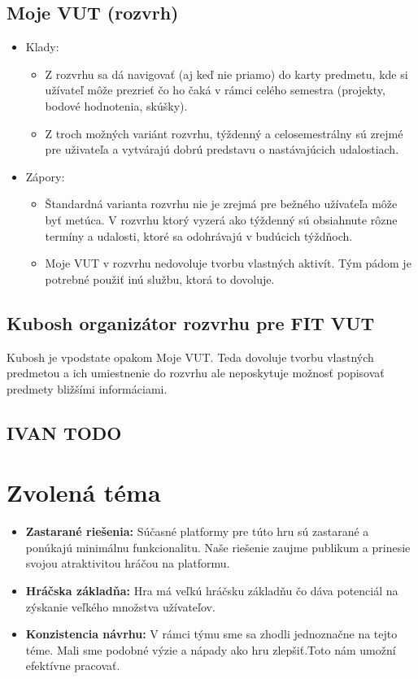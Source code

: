 \documentclass[a4paper, 11pt, onecolumn]{article}
\begin{document}
\subsection*{Moje VUT (rozvrh)}
\begin{itemize}
    \item Klady:
    \begin{itemize}
        \item Z rozvrhu sa dá navigovať (aj keď nie priamo) do karty predmetu, kde si užívateľ môže prezrieť čo ho čaká v rámci celého semestra (projekty, bodové hodnotenia, skúšky). 
        \item Z troch možných variánt rozvrhu, týždenný a celosemestrálny sú zrejmé pre uživateľa a vytvárajú dobrú predstavu o nastávajúcich udalostiach. 
    \end{itemize}
    \item Zápory:
    \begin{itemize}
        \item Štandardná varianta rozvrhu nie je zrejmá pre bežného užívaťeľa môže byť metúca. V rozvrhu ktorý vyzerá ako týždenný sú obsiahnute rôzne termíny a udalosti, ktoré sa odohrávajú v budúcich týždňoch.
        \item Moje VUT v rozvrhu nedovoluje tvorbu vlastných aktivít. Tým pádom je potrebné použiť inú službu, ktorá to dovoluje.
    \end{itemize}
\end{itemize}
\subsection*{Kubosh organizátor rozvrhu pre FIT VUT}
Kubosh je vpodstate opakom Moje VUT. Teda dovoluje tvorbu vlastných predmetou a ich umiestnenie do rozvrhu
ale neposkytuje možnosť popisovať predmety bližšími informáciami.
\subsection{IVAN TODO}
\section{Zvolená téma}
\begin{itemize}
\item \textbf{Zastarané riešenia:} Súčasné platformy pre túto hru sú zastarané a ponúkajú minimálnu funkcionalitu. Naše riešenie zaujme publikum a prinesie svojou atraktivitou hráčou na platformu.
\item \textbf{Hráčska základňa:} Hra má veľkú hráčsku základňu čo  dáva potenciál na zýskanie veľkého množstva užívateľov.
\item \textbf{Konzistencia návrhu:} V rámci týmu sme sa zhodli jednoznačne na tejto téme. Mali sme podobné výzie a nápady ako hru zlepšiť.Toto nám umožní efektívne pracovať.
\end{itemize}
\end{document}
